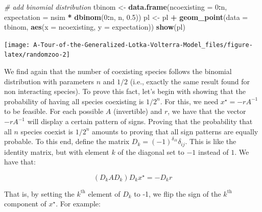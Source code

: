 \documentclass[]{book}
\newenvironment{Shaded}{\begin{snugshade}}{\end{snugshade}}
\newcommand{\CommentTok}[1]{\textcolor[rgb]{0.56,0.35,0.01}{\textit{#1}}}
\newcommand{\DataTypeTok}[1]{\textcolor[rgb]{0.13,0.29,0.53}{#1}}
\newcommand{\DecValTok}[1]{\textcolor[rgb]{0.00,0.00,0.81}{#1}}
\newcommand{\FloatTok}[1]{\textcolor[rgb]{0.00,0.00,0.81}{#1}}
\newcommand{\KeywordTok}[1]{\textcolor[rgb]{0.13,0.29,0.53}{\textbf{#1}}}
\newcommand{\NormalTok}[1]{#1}
\newcommand{\OperatorTok}[1]{\textcolor[rgb]{0.81,0.36,0.00}{\textbf{#1}}}
\newcommand{\StringTok}[1]{\textcolor[rgb]{0.31,0.60,0.02}{#1}}
\begin{document}
\begin{Shaded}
\begin{Highlighting}[]
\CommentTok{# add binomial distribution}
\NormalTok{tbinom <-}\StringTok{ }\KeywordTok{data.frame}\NormalTok{(}\DataTypeTok{ncoexisting =} \DecValTok{0}\OperatorTok{:}\NormalTok{n, }
                 \DataTypeTok{expectation =}\NormalTok{ nsim }\OperatorTok{*}\StringTok{ }\KeywordTok{dbinom}\NormalTok{(}\DecValTok{0}\OperatorTok{:}\NormalTok{n, n, }\FloatTok{0.5}\NormalTok{))}
\NormalTok{pl <-}\StringTok{ }\NormalTok{pl }\OperatorTok{+}\StringTok{ }\KeywordTok{geom_point}\NormalTok{(}\DataTypeTok{data =}\NormalTok{ tbinom, }\KeywordTok{aes}\NormalTok{(}\DataTypeTok{x =}\NormalTok{ ncoexisting, }\DataTypeTok{y =}\NormalTok{ expectation))}
\KeywordTok{show}\NormalTok{(pl)}
\end{Highlighting}
\end{Shaded}

\begin{center}\texttt{[image: A-Tour-of-the-Generalized-Lotka-Volterra-Model\_files/figure-latex/randomzoo-2]} \end{center}

We find again that the number of coexisting species follows the binomial distribution with parameters \(n\) and \(1/2\) (i.e., exactly the same result found for non interacting species). To prove this fact, let's begin with showing that the probability of having all species coexisting is \(1 / 2^n\). For this, we need \(x^\star = -r A^{-1}\) to be feasible. For each possible \(A\) (invertible) and \(r\), we have that the vector \(-r A^{-1}\) will display a certain pattern of signs. Proving that the probability that all \(n\) species coexist is \(1 / 2^n\) amounts to proving that all sign patterns are equally probable. To this end, define the matrix \(D_k = (-1)^{\delta_{ik}} \delta_{ij}\). This is like the identity matrix, but with element \(k\) of the diagonal set to \(-1\) instead of \(1\). We have that:

\[
(D_k A D_k) D_k x^\star = -D_k r
\]

That is, by setting the \(k^\text{th}\) element of \(D_k\) to -1, we flip the sign of the \(k^\text{th}\) component of \(x^\star\). For example:
\end{document}
